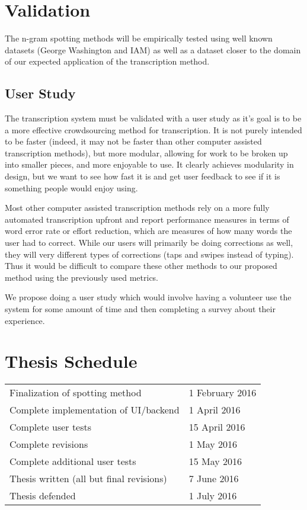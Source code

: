 \documentclass[ms]{byuprop}
\begin{document}
\section{Validation}
The n-gram spotting methods will be empirically tested using well known datasets (George Washington\cite{GW} and IAM\cite{IAM}) as well as a dataset closer to the domain of our expected application of the transcription method.

\subsection{User Study}

The transcription system must be validated with a user study as it's goal is to be a more effective crowdsourcing method for transcription. It is not purely intended to be faster (indeed, it may not be faster than other computer assisted transcription methods), but more modular, allowing for work to be broken up into smaller pieces, and more enjoyable to use. It clearly achieves modularity in design, but we want to see how fast it is and get user feedback to see if it is something people would enjoy using.

Most other computer assisted transcription methods rely on a more fully automated transcription upfront and report performance measures in terms of word error rate or effort reduction, which are measures of how many words the user had to correct. While our users will primarily be doing corrections as well, they will very different types of corrections (taps and swipes instead of typing). Thus it would be difficult to compare these other methods to our proposed method using the previously used metrics.

We propose doing a user study which would involve having a volunteer use the system for some amount of time and then completing a survey about their experience.

\section{Thesis Schedule}
\begin{table}[H]
\centering
\begin{tabular}{ll}
Finalization of spotting method          & 1 February 2016 \\
Complete implementation of UI/backend    & 1 April 2016    \\
Complete user tests                      & 15 April 2016   \\
Complete revisions                       & 1 May 2016      \\
Complete additional user tests           & 15 May 2016     \\
Thesis written (all but final revisions) & 7 June 2016     \\
Thesis defended                          & 1 July 2016    
\end{tabular}
\end{table}




\end{document}
